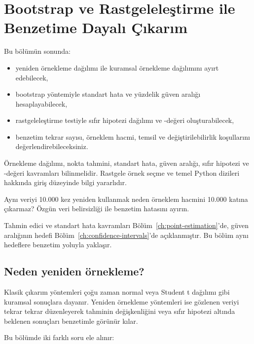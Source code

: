 \chapter{Bootstrap ve Rastgeleleştirme ile Benzetime Dayalı Çıkarım}
\label{ch:resampling}

\begin{hedefler}
Bu bölümün sonunda:
\begin{itemize}
  \item yeniden örnekleme dağılımı ile kuramsal örnekleme dağılımını ayırt edebilecek,
  \item bootstrap yöntemiyle standart hata ve yüzdelik güven aralığı hesaplayabilecek,
  \item rastgeleleştirme testiyle sıfır hipotezi dağılımı ve \pval-değeri oluşturabilecek,
  \item benzetim tekrar sayısı, örneklem hacmi, temsil ve değiştirilebilirlik koşullarını değerlendirebileceksiniz.
\end{itemize}
\end{hedefler}

\begin{prerequisitebox}
Örnekleme dağılımı, nokta tahmini, standart hata, güven aralığı, sıfır
hipotezi ve \pval-değeri kavramları bilinmelidir. Rastgele örnek seçme ve temel
Python dizileri hakkında giriş düzeyinde bilgi yararlıdır.
\end{prerequisitebox}

\begin{hazirlik}
Aynı veriyi 10.000 kez yeniden kullanmak neden örneklem hacmini 10.000 katına
çıkarmaz? Özgün veri belirsizliği ile benzetim hatasını ayırın.
\end{hazirlik}

Tahmin edici ve standart hata kavramları Bölüm~\ref{ch:point-estimation}'de,
güven aralığının hedefi Bölüm~\ref{ch:confidence-intervals}'de açıklanmıştır.
Bu bölüm aynı hedeflere benzetim yoluyla yaklaşır.

\section{Neden yeniden örnekleme?}

Klasik çıkarım yöntemleri çoğu zaman normal veya Student t dağılımı gibi
kuramsal sonuçlara dayanır. Yeniden örnekleme yöntemleri ise gözlenen veriyi
tekrar tekrar düzenleyerek tahminin değişkenliğini veya sıfır hipotezi altında
beklenen sonuçları benzetimle görünür kılar.

Bu bölümde iki farklı soru ele alınır:

